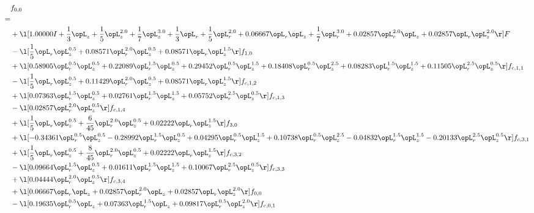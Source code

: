 \begin{alignat}{2} 
\label{eq:f_00_1} 
& f_{0,0} \nonumber \\ 
 = \\ 
& + \l[  1.00000 I + \frac{1}{3} \opL_z + \frac{1}{5} \opL_z^{2.0} + \frac{1}{7} \opL_z^{3.0} + \frac{1}{3} \opL_r + \frac{1}{5} \opL_r^{2.0} +  0.06667 \opL_r \opL_z + \frac{1}{7} \opL_r^{3.0} +  0.02857 \opL_r^{2.0} \opL_z +  0.02857 \opL_r \opL_z^{2.0}  \r] F \nonumber \\ 
& - \l[ \frac{1}{5} \opL_r \opL_z^{0.5} +  0.08571 \opL_r^{2.0} \opL_z^{0.5} +  0.08571 \opL_r \opL_z^{1.5}  \r] f_{1,0} \nonumber \\ 
& + \l[  0.58905 \opL_r^{0.5} \opL_z^{0.5} +  0.22089 \opL_r^{1.5} \opL_z^{0.5} +  0.29452 \opL_r^{0.5} \opL_z^{1.5} +  0.18408 \opL_r^{0.5} \opL_z^{2.5} +  0.08283 \opL_r^{1.5} \opL_z^{1.5} +  0.11505 \opL_r^{2.5} \opL_z^{0.5}  \r] f_{c,1,1} \nonumber \\ 
& - \l[ \frac{1}{5} \opL_r \opL_z^{0.5} +  0.11429 \opL_r^{2.0} \opL_z^{0.5} +  0.08571 \opL_r \opL_z^{1.5}  \r] f_{c,1,2} \nonumber \\ 
& + \l[  0.07363 \opL_r^{1.5} \opL_z^{0.5} +  0.02761 \opL_r^{1.5} \opL_z^{1.5} +  0.05752 \opL_r^{2.5} \opL_z^{0.5}  \r] f_{c,1,3} \nonumber \\ 
& - \l[  0.02857 \opL_r^{2.0} \opL_z^{0.5}  \r] f_{c,1,4} \nonumber \\ 
& + \l[ \frac{1}{5} \opL_r \opL_z^{0.5} + \frac{6}{45} \opL_r^{2.0} \opL_z^{0.5} +  0.02222 \opL_r \opL_z^{1.5}  \r] f_{3,0} \nonumber \\ 
& + \l[  -0.34361 \opL_r^{0.5} \opL_z^{0.5}   -0.28992 \opL_r^{1.5} \opL_z^{0.5} +  0.04295 \opL_r^{0.5} \opL_z^{1.5} +  0.10738 \opL_r^{0.5} \opL_z^{2.5}   -0.04832 \opL_r^{1.5} \opL_z^{1.5}   -0.20133 \opL_r^{2.5} \opL_z^{0.5}  \r] f_{c,3,1} \nonumber \\ 
& + \l[ \frac{1}{5} \opL_r \opL_z^{0.5} + \frac{8}{45} \opL_r^{2.0} \opL_z^{0.5} +  0.02222 \opL_r \opL_z^{1.5}  \r] f_{c,3,2} \nonumber \\ 
& - \l[  0.09664 \opL_r^{1.5} \opL_z^{0.5} +  0.01611 \opL_r^{1.5} \opL_z^{1.5} +  0.10067 \opL_r^{2.5} \opL_z^{0.5}  \r] f_{c,3,3} \nonumber \\ 
& + \l[  0.04444 \opL_r^{2.0} \opL_z^{0.5}  \r] f_{c,3,4} \nonumber \\ 
& + \l[  0.06667 \opL_r \opL_z +  0.02857 \opL_r^{2.0} \opL_z +  0.02857 \opL_r \opL_z^{2.0}  \r] f_{0,0} \nonumber \\ 
& - \l[  0.19635 \opL_r^{0.5} \opL_z +  0.07363 \opL_r^{1.5} \opL_z +  0.09817 \opL_r^{0.5} \opL_z^{2.0}  \r] f_{c,0,1} \nonumber \\ 

\end{alignat}
